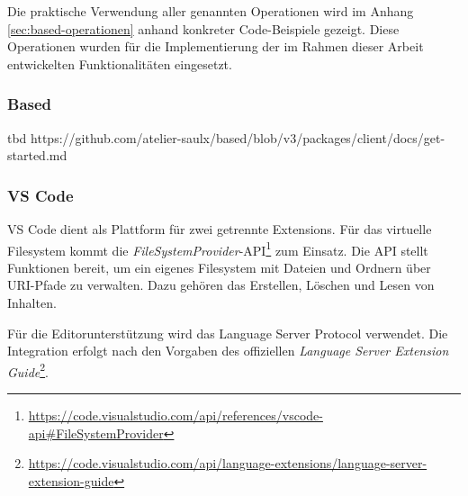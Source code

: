 Die praktische Verwendung aller genannten Operationen wird im Anhang \ref{sec:based-operationen} anhand konkreter Code-Beispiele gezeigt. Diese Operationen wurden für die Implementierung der im Rahmen dieser Arbeit entwickelten Funktionalitäten eingesetzt.

\subsubsection*{Based}
tbd
https://github.com/atelier-saulx/based/blob/v3/packages/client/docs/get-started.md





\subsubsection*{VS Code}
VS Code dient als Plattform für zwei getrennte Extensions. Für das virtuelle Filesystem kommt die \textit{FileSystemProvider}-API\footnote{\url{https://code.visualstudio.com/api/references/vscode-api\#FileSystemProvider}} zum Einsatz. Die API stellt Funktionen bereit, um ein eigenes Filesystem mit Dateien und Ordnern über URI-Pfade zu verwalten. Dazu gehören das Erstellen, Löschen und Lesen von Inhalten. 

Für die Editorunterstützung wird das Language Server Protocol verwendet. Die Integration erfolgt nach den Vorgaben des offiziellen \textit{Language Server Extension Guide}\footnote{\url{https://code.visualstudio.com/api/language-extensions/language-server-extension-guide}}.

